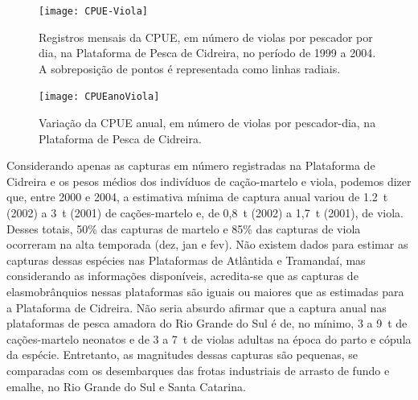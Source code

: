 \documentclass[a4paper,11pt,twoside,showtrims,onecolumn,openright,final]{memoir}
\begin{document}
%
%

\begin{figure}
\begin{center}
\texttt{[image: CPUE-Viola]}
\end{center}
\caption[Registros mensais da CPUE, em número de violas por pescador por dia, 
         na Plataforma de Pesca de Cidreira, no período de 1999 a 2004.]
        {Registros mensais da CPUE, em número de violas por pescador por dia, 
         na Plataforma de Pesca de Cidreira, no período de 1999 a 2004. 
         A sobreposição de pontos é representada como linhas radiais.}
\label{fig:amador-cpueviola}
\end{figure}


%
%

\begin{figure}
\begin{center}
\texttt{[image: CPUEanoViola]}
\end{center}
\caption{Variação da CPUE anual, em número de violas por pescador-dia, na Plataforma de Pesca de Cidreira.}
\label{fig:amador-cpueanualviola}
\end{figure}


Considerando apenas as capturas em número registradas na Plataforma de Cidreira 
e os pesos médios dos indivíduos de cação-martelo e viola, podemos dizer que, 
entre 2000 e 2004, a estimativa mínima de captura anual variou de 1.2~t (2002) a 3~t (2001) 
de cações-martelo e, de 0,8~t (2002) a 1,7~t (2001), de viola. 
Desses totais, 50\% das capturas de martelo e 85\% das capturas de viola ocorreram 
na alta temporada (dez, jan e fev). Não existem dados para estimar as capturas dessas espécies 
nas Plataformas de Atlântida e Tramandaí, mas considerando as informações disponíveis, 
acredita-se que as capturas de elasmobrânquios nessas plataformas são iguais ou maiores 
que as estimadas para a Plataforma de Cidreira. Não seria absurdo afirmar que a captura anual 
nas plataformas de pesca amadora do Rio Grande do Sul é de, no mínimo, 3 a 9~t de cações-martelo 
neonatos e de 3 a 7~t de violas adultas na época do parto e cópula da espécie. Entretanto, 
as magnitudes dessas capturas são pequenas, se comparadas com os desembarques das frotas 
industriais de arrasto de fundo e emalhe, no Rio Grande do Sul e Santa Catarina. %
\end{document}
